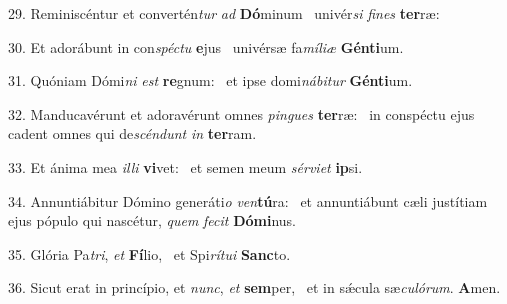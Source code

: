 29. Reminiscéntur et convertén\textit{tur} \textit{ad} \textbf{Dó}minum \ast\  univér\textit{si} \textit{fi}\textit{nes} \textbf{ter}ræ:\

30. Et adorábunt in con\textit{spéc}\textit{tu} \textbf{e}jus \ast\  univérsæ fa\textit{mí}\textit{li}\textit{æ} \textbf{Gén}\textbf{ti}um.\

31. Quóniam Dómi\textit{ni} \textit{est} \textbf{re}gnum: \ast\  et ipse domi\textit{ná}\textit{bi}\textit{tur} \textbf{Gén}\textbf{ti}um.\

32. Manducavérunt et adoravérunt omnes \textit{pin}\textit{gues} \textbf{ter}ræ: \ast\  in conspéctu ejus cadent omnes qui de\textit{scén}\textit{dunt} \textit{in} \textbf{ter}ram.\

33. Et ánima mea \textit{il}\textit{li} \textbf{vi}vet: \ast\  et semen meum \textit{sér}\textit{vi}\textit{et} \textbf{ip}si.\

34. Annuntiábitur Dómino generáti\textit{o} \textit{ven}\textbf{tú}ra: \ast\  et annuntiábunt cæli justítiam ejus pópulo qui nascétur, \textit{quem} \textit{fe}\textit{cit} \textbf{Dó}\textbf{mi}nus.\

35. Glória Pa\textit{tri}, \textit{et} \textbf{Fí}lio, \ast\  et Spi\textit{rí}\textit{tu}\textit{i} \textbf{Sanc}to.\

36. Sicut erat in princípio, et \textit{nunc}, \textit{et} \textbf{sem}per, \ast\  et in sǽcula sæ\textit{cu}\textit{ló}\textit{rum}. \textbf{A}men.\

